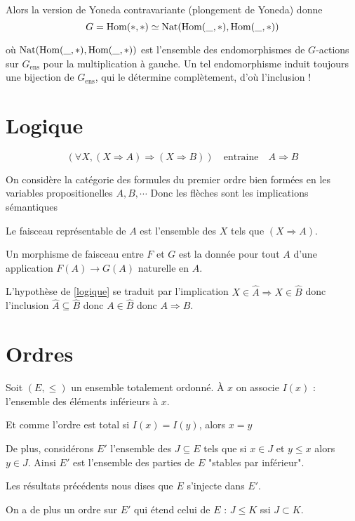 \documentclass[12pt,makeidx, draft]{amsart}
\DeclareMathOperator\Nat{\text{Nat}}
\begin{document}
Alors la version de Yoneda contravariante (plongement de Yoneda) donne
\begin{equation}
G = \Hom(*,*) \simeq \Nat(\Hom(\_,*),\Hom(\_,*))
\end{equation}

où $\Nat(\Hom(\_,*),\Hom(\_,*))$ est l'ensemble des endomorphismes de $G$-actions sur $G_{\text{ens}}$ pour la multiplication à gauche. 
Un tel endomorphisme induit toujours une bijection de $G_{\text{ens}}$, qui le détermine complètement, d'où l'inclusion !

\section{Logique}
\begin{equation}\label{logique}
( \forall X, (X \Rightarrow A) \Rightarrow (X \Rightarrow B))
\quad
\text{entraine}
\quad
A \Rightarrow B
\end{equation}

On considère la catégorie des formules du premier ordre bien formées en les variables propositionelles $A,B,\cdots$
Donc les flèches sont les implications sémantiques

Le faisceau représentable de $A$ est l'ensemble des $X$ tels que $(X\Rightarrow A)$.

Un morphisme de faisceau entre $F$ et $G$ est la donnée pour tout $A$ d'une application $F(A) \to G(A)$ naturelle en $A$.

L'hypothèse de \eqref{logique} se traduit par l'implication $X \in \hat{A} \Rightarrow X \in \hat{B}$ donc l'inclusion $\hat{A} \subseteq \hat{B}$ donc $A \in \hat{B}$ donc $A \Rightarrow B$.

\section{Ordres}

Soit $(E,\leq)$ un ensemble totalement ordonné.
À $x$ on associe $I(x)$ : l'ensemble des éléments inférieurs à $x$.

Et comme l'ordre est total si $I(x) = I(y)$, alors $x=y$

De plus, considérons $E'$ l'ensemble des $J \subseteq E$ tels que si $x \in J$ et $y \leq x$ alors $y \in J$. Ainsi $E'$ est l'ensemble des parties de $E$ "stables par inférieur".

Les résultats précédents nous dises que $E$ s'injecte dans $E'$.

On a de plus un ordre sur $E'$ qui étend celui de $E$ : 
$J \leq K$ ssi $J \subset K$.
\end{document}

